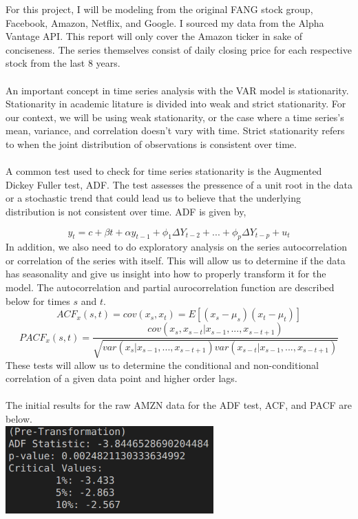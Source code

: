 \documentclass{article}
\begin{document}
For this project, I will be modeling from the original FANG stock group, Facebook, Amazon, Netflix, and Google. I sourced my data from the Alpha Vantage API. This report will only cover the Amazon ticker in sake of conciseness. The series themselves consist of daily closing price for each respective stock from the last 8 years. 
\\ \\
An important concept in time series analysis with the VAR model is stationarity. Stationarity in academic litature is divided into weak and strict stationarity. For our context, we will be using weak stationarity, or the case where a time series's mean, variance, and correlation doesn't vary with time. Strict stationarity refers to when the joint distribution of observations is consistent over time.
\\ \\
A common test used to check for time series stationarity is the Augmented Dickey Fuller test, ADF. The test assesses the pressence of a unit root in the data or a stochastic trend that could lead us to believe that the underlying distribution is not consistent over time. ADF is given by,

\[y_t = c + \beta t + \alpha y_{t-1} + \phi_1 \Delta Y_{t-2} + ... + \phi_p \Delta Y_{t-p} + u_t\]
In addition, we also need to do exploratory analysis on the series autocorrelation or correlation of the series with itself. This will allow us to determine if the data has seasonality and give us insight into how to properly transform it for the model. The autocorrelation and partial aurocorrelation function are described below for times $s$ and $t$.
\[ACF_x(s,t)=cov(x_s,x_t)=E[(x_s-\mu_s)(x_t-\mu_t)]\]
\[PACF_x(s,t)=\frac{cov(x_s,x_{s-t}|x_{s-1}, ..., x_{s-t+1})}{\sqrt{var(x_s|x_{s-1}, ..., x_{s-t+1})var(x_{s-t}|x_{s-1}, ..., x_{s-t+1})}}\]
These tests will allow us to determine the conditional and non-conditional correlation of a given data point and higher order lags.
\\ \\
The initial results for the raw AMZN data for the ADF test, ACF, and PACF are below.
\\
\includegraphics[width=0.6\textwidth]{../output/pre-adf.png}
\end{document}
